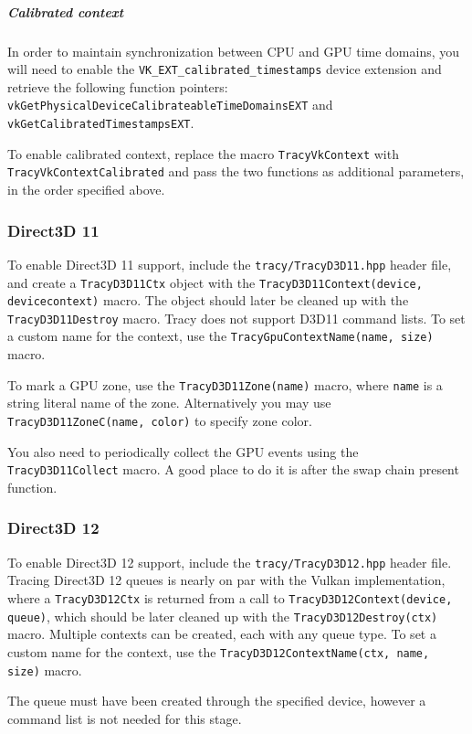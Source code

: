 \documentclass[hidelinks,titlepage,a4paper]{article}
\begin{document}
\subparagraph{Calibrated context}

In order to maintain synchronization between CPU and GPU time domains, you will need to enable the \texttt{VK\_EXT\_calibrated\_timestamps} device extension and retrieve the following function pointers: \texttt{vkGetPhysicalDeviceCalibrateableTimeDomainsEXT} and \texttt{vkGetCalibratedTimestampsEXT}.

To enable calibrated context, replace the macro \texttt{TracyVkContext} with \texttt{TracyVkContextCalibrated} and pass the two functions as additional parameters, in the order specified above.

\subsubsection{Direct3D 11}

To enable Direct3D 11 support, include the \texttt{tracy/TracyD3D11.hpp} header file, and create a \texttt{TracyD3D11Ctx} object with the \texttt{TracyD3D11Context(device, devicecontext)} macro. The object should later be cleaned up with the \texttt{TracyD3D11Destroy} macro. Tracy does not support D3D11 command lists. To set a custom name for the context, use the \texttt{TracyGpuContextName(name, size)} macro.

To mark a GPU zone, use the \texttt{TracyD3D11Zone(name)} macro, where \texttt{name} is a string literal name of the zone. Alternatively you may use \texttt{TracyD3D11ZoneC(name, color)} to specify zone color.

You also need to periodically collect the GPU events using the \texttt{TracyD3D11Collect} macro. A good place to do it is after the swap chain present function.

\subsubsection{Direct3D 12}

To enable Direct3D 12 support, include the \texttt{tracy/TracyD3D12.hpp} header file. Tracing Direct3D 12 queues is nearly on par with the Vulkan implementation, where a \texttt{TracyD3D12Ctx} is returned from a call to \texttt{TracyD3D12Context(device, queue)}, which should be later cleaned up with the \texttt{TracyD3D12Destroy(ctx)} macro. Multiple contexts can be created, each with any queue type. To set a custom name for the context, use the \texttt{TracyD3D12ContextName(ctx, name, size)} macro.

The queue must have been created through the specified device, however a command list is not needed for this stage.
\end{document}
